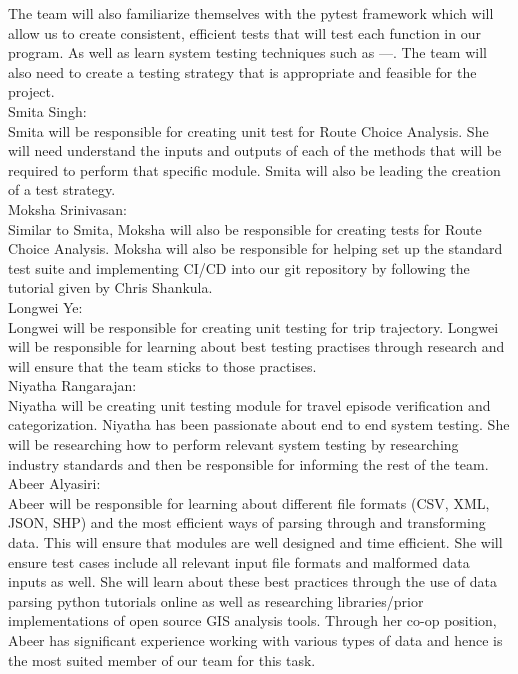 \documentclass[12pt, titlepage]{article}
\begin{document}
\noindent The team will also familiarize themselves with the pytest framework which will allow us to create consistent, efficient tests that will test each function in our program. As well as learn system testing techniques such as ---.  The team will also need to create a testing strategy that is appropriate and feasible for the project.\\

\noindent Smita Singh:\\ Smita will be responsible for creating unit test for Route Choice Analysis. She will need understand the inputs and outputs of each of the methods that will be required to perform that specific module. Smita will also be leading the creation of a test strategy. \\

\noindent Moksha Srinivasan:\\ Similar to Smita, Moksha will also be responsible for creating tests for Route Choice Analysis. Moksha will also be responsible for helping set up the standard test suite and implementing CI/CD into our git repository by following the tutorial given by Chris Shankula. \\

\noindent Longwei Ye:\\
Longwei will be responsible for creating unit testing for trip trajectory. Longwei will be responsible for learning about best testing practises through research and will ensure that the team sticks to those practises.\\

\noindent Niyatha Rangarajan:\\
Niyatha will be creating unit testing module for travel episode verification and categorization. Niyatha has been passionate about end to end system testing. She will be researching how to perform relevant system testing by researching industry standards and then be responsible for informing the rest of the team.\\

\noindent Abeer Alyasiri:\\ Abeer will be responsible for learning about different file formats (CSV, XML, JSON, SHP) and the most efficient ways of parsing through and transforming data. This will ensure that modules are well designed and time efficient. She will ensure test cases include all relevant input file formats and malformed data inputs as well. She will learn about these best practices through the use of data parsing python tutorials online as well as researching libraries/prior implementations of open source GIS analysis tools. Through her co-op position, Abeer has significant experience working with various types of data and hence is the most suited member of our team for this task.   \\
\end{document}
